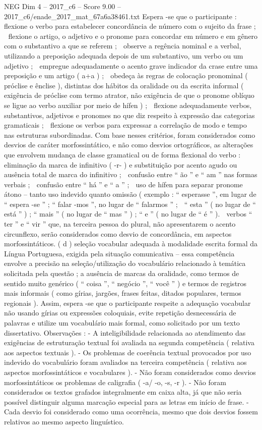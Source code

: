 \begin{textsample}{NEG Dim 4 – 2017\_c6 – Score 9.00 – 2017\_c6/enade\_2017\_mat\_67a6a38461.txt}
Espera -se que o participante :  flexione o verbo para estabelecer concordância de número com o sujeito da frase ;  flexione o artigo, o adjetivo e o pronome para concordar em número e em gênero com o substantivo a que se referem ;  observe a regência nominal e a verbal, utilizando a preposição adequada depois de um substantivo, um verbo ou um adjetivo ;  empregue adequadamente o acento grave indicador da crase entre uma preposição e um artigo ( a+a ) ;  obedeça às regras de colocação pronominal ( próclise e ênclise ), distintas dos hábitos da oralidade ou da escrita informal ( exigência de próclise com termo atrator, não exigência de que o pronome oblíquo se ligue ao verbo auxiliar por meio de hífen ) ;  flexione adequadamente verbos, substantivos, adjetivos e pronomes no que diz respeito à expressão das categorias gramaticais ;  flexione os verbos para expressar a correlação de modo e tempo nas estruturas subordinadas.
Com base nesses critérios, foram considerados como desvios de caráter morfossintático, e não como desvios ortográficos, as alterações que envolvem mudança de classe gramatical ou de forma flexional do verbo :  eliminação da marca de infinitivo ( -r- ) e substituição por acento agudo ou ausência total de marca do infinitivo ;  confusão entre “ ão ” e “ am ” nas formas verbais ;  confusão entre “ há ” e “ a ” ;  uso de hífen para separar pronome átono – tanto uso indevido quanto omissão ( exemplo : “ esperasse ”, em lugar de “ espera -se ” ; “ falar -mos ”, no lugar de “ falarmos ” ;  “ esta ” ( no lugar de “ está ” ) ; “ mais ” ( no lugar de “ mas ” ) ; “ e ” ( no lugar de “ é ” ).  verbos “ ter ” e “ vir ” que, na terceira pessoa do plural, não apresentarem o acento circunflexo, serão considerados como desvio de concordância, em aspectos morfossintáticos. ( d ) seleção vocabular adequada à modalidade escrita formal da Língua Portuguesa, exigida pela situação comunicativa – essa competência envolve a precisão na seleção/utilização do vocabulário relacionado à temática solicitada pela questão ; a ausência de marcas da oralidade, como termos de sentido muito genérico ( “ coisa ”, “ negócio ”, “ você ” ) e termos de registros mais informais ( como gírias, jargões, frases feitas, ditados populares, termos regionais ).
Assim, espera -se que o participante respeite a adequação vocabular não usando gírias ou expressões coloquiais, evite repetição desnecessária de palavras e utilize um vocabulário mais formal, como solicitado por um texto dissertativo.
Observações : - A inteligibilidade relacionada ao atendimento das exigências de estruturação textual foi avaliada na segunda competência ( relativa aos aspectos textuais ). - Os problemas de coerência textual provocados por uso indevido do vocabulário foram avaliados na terceira competência ( relativa aos aspectos morfossintáticos e vocabulares ). - Não foram considerados como desvios morfossintáticos os problemas de caligrafia ( -a/ -o, -s, -r ). - Não foram considerados os textos grafados integralmente em caixa alta, já que não seria possível distinguir alguma marcação especial para as letras em início de frase. - Cada desvio foi considerado como uma ocorrência, mesmo que dois desvios fossem relativos ao mesmo aspecto linguístico.

\end{textsample}
